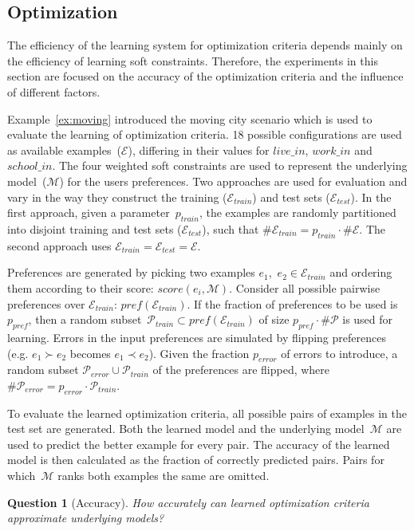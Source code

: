 \documentclass[letterpaper]{article}
\newcommand{\sym}[1]{\ensuremath{\mathcal{#1}}}
\newtheorem{question}{Question}
\theoremstyle{definition}
\begin{document}
\subsection{Optimization}
The efficiency of the learning system for optimization criteria depends mainly on the efficiency of learning soft constraints.
Therefore, the experiments in this section are focused on the accuracy of the optimization criteria and the influence of different factors.

Example~\ref{ex:moving} introduced the moving city scenario which is used to evaluate the learning of optimization criteria.
18 possible configurations are used as available examples~(\sym{E}), differing in their values for $\mathit{live\_in}$, $\mathit{work\_in}$ and $\mathit{school\_in}$.
The four weighted soft constraints are used to represent the underlying model~(\sym{M}) for the users preferences.
Two approaches are used for evaluation and vary in the way they construct the training ($\sym{E}_{train}$) and test sets ($\sym{E}_{test}$).
In the first approach, given a parameter~$p_{train}$, the examples are randomly partitioned into disjoint training and test sets ($\sym{E}_{test}$), such that $\#\sym{E}_{train} = p_{train} \cdot \#\sym{E}$.
The second approach uses $\sym{E}_{train} = \sym{E}_{test} = \sym{E}$.

Preferences are generated by picking two examples $e_1$,~$e_2 \in \sym{E}_{train}$ and ordering them according to their score: $score(e_i, \sym{M})$.
Consider all possible pairwise preferences over $\sym{E}_{train}$: $\mathit{pref}(\sym{E}_{train})$.
If the fraction of preferences to be used is~$p_{pref}$, then a random subset~$\sym{P}_{train} \subset \mathit{pref}(\sym{E}_{train})$ of size $p_{pref} \cdot \# \sym{P}$ is used for learning.
Errors in the input preferences are simulated by flipping preferences (e.g. $e_1 \succ e_2$ becomes $e_1 \prec e_2$).
Given the fraction $p_{error}$ of errors to introduce, a random subset $\sym{P}_{error} \cup \sym{P}_{train}$ of the preferences are flipped, where $\#\sym{P}_{error} = p_{error} \cdot \sym{P}_{train}$.

To evaluate the learned optimization criteria, all possible pairs of examples in the test set are generated.
Both the learned model and the underlying model~$\sym{M}$ are used to predict the better example for every pair.
The accuracy of the learned model is then calculated as the fraction of correctly predicted pairs. 
Pairs for which~\sym{M} ranks both examples the same are omitted.

\begin{question}[Accuracy]
  How accurately can learned optimization criteria approximate underlying models?
\end{question}
\end{document}
